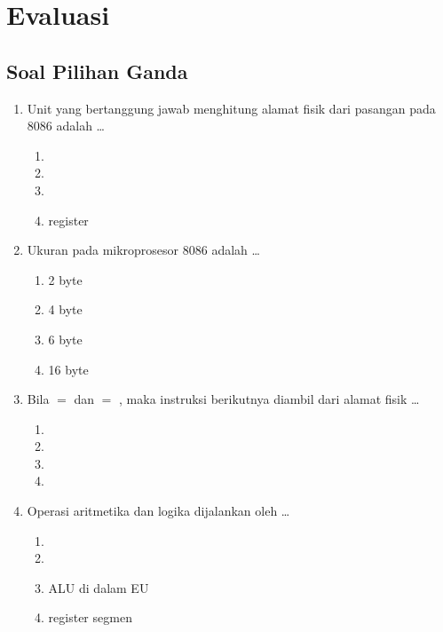 \section{Evaluasi}
\label{sec:evaluasi-bab4}

\subsection{Soal Pilihan Ganda}

\begin{enumerate}
    \item Unit yang bertanggung jawab menghitung alamat fisik dari
          pasangan  pada 8086 adalah \dots
          \begin{enumerate}
              \item {}
              \item {}
              \item {}
              \item register 
          \end{enumerate}

    \item Ukuran  pada mikroprosesor 8086
          adalah \dots
          \begin{enumerate}
              \item 2 byte \item 4 byte
              \item 6 byte \item 16 byte
          \end{enumerate}

    \item Bila  $=$  dan  $=$ ,
          maka instruksi berikutnya diambil dari alamat fisik \dots
          \begin{enumerate}
              \item {} \item {}
              \item {} \item {}
          \end{enumerate}

    \item Operasi aritmetika dan logika dijalankan oleh \dots
          \begin{enumerate}
              \item {}
              \item {}
              \item ALU di dalam EU
              \item register segmen
          \end{enumerate}


\end{enumerate}
